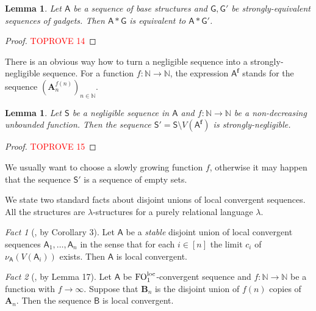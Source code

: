 \documentclass[11pt]{article}
\theoremstyle{plain}
\newtheorem{lemma}[theorem]{Lemma}
\theoremstyle{definition}
\theoremstyle{remark}
\newtheorem{fact}{Fact}
\newcommand{\N}{\mathbb{N}}
\DeclareMathOperator\FO{FO}
\newcommand{\FOloc}[1]{\FO_{#1}^\textnormal{loc}}
\newcommand{\str}[1]{\mathbf{#1}}
\newcommand{\strseq}[1]{{\boldsymbol{\mathsf{#1}}}}
\newcommand{\seq}[1]{{\mathsf{#1}}}
\begin{document}
\begin{lemma}\label{lem:negligible_sequences_and_equivalent_structures}
    Let $\strseq{A}$ be a sequence of base structures and $\strseq{G}, \strseq{G}'$ be strongly-equivalent sequences of gadgets.
    Then $\strseq{A}*\strseq{G}$ is equivalent to $\strseq{A}*\strseq{G}'$.
\end{lemma}
\begin{proof}\textcolor{red}{TOPROVE 14}\end{proof}

There is an obvious way how to turn a negligible sequence into a strongly-negligible sequence.
For a function $f: \N \to \N$, the expression $\strseq{A}^{\bm{f}}$ stands for the sequence $(\str{A}_n^{f(n)})_{n \in \N}$.

\begin{lemma}\label{lem:from_negligible_to_strongly_negligible}
    Let $\seq{S}$ be a negligible sequence in $\strseq{A}$ and $f: \N \to \N$ be a non-decreasing unbounded function.
    Then the sequence $\seq{S}' = \seq{S} \setminus V(\strseq{A}^{\bm{f}})$ is strongly-negligible.
\end{lemma}
\begin{proof}\textcolor{red}{TOPROVE 15}\end{proof}

We usually want to choose a slowly growing function $f$, otherwise it may happen that the sequence $\seq{S}'$ is a sequence of empty sets.

We state two standard facts about disjoint unions of local convergent sequences.
All the structures are $\lambda$-structures for a purely relational language $\lambda$.

\begin{fact}[\cite{clustering}, by Corollary 3]\label{fact:union_of_convergent_sequences}
    Let $\strseq{A}$ be a \emph{stable} disjoint union of local convergent sequences $\strseq{A}_1, \dots, \strseq{A}_n$ in the sense that for each $i \in [n]$ the limit $c_i$ of $\nu_\strseq{A}(V(\strseq{A}_i))$ exists.
    Then $\strseq{A}$ is local convergent.
\end{fact}

\begin{fact}[\cite{modeling_limits_in_hereditary_classes}, by Lemma 17]\label{fact:union_of_infinitely_many_copies}
    Let $\strseq{A}$ be $\FOloc{1}$-convergent sequence and $f: \N \to \N$ be a function with $f \to \infty$.
    Suppose that $\str{B}_n$ is the disjoint union of $f(n)$ copies of $\str{A}_n$.
    Then the sequence $\strseq{B}$ is local convergent.
\end{fact}
\end{document}
